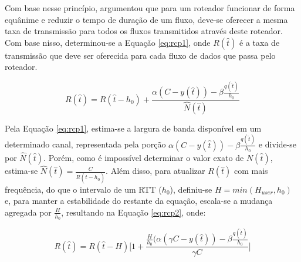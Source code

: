 Com base nesse princípio,  argumentou que para um roteador funcionar de forma equânime e reduzir o tempo de duração de um fluxo, deve-se oferecer a mesma taxa de transmissão para todos os fluxos transmitidos através deste roteador.
Com base nisso, determinou-se a Equação \ref{eq:rcp1}, onde $R(\hat{t})$ é a taxa de transmissão que deve ser oferecida para cada fluxo de dados que passa pelo roteador.

\begin{equation}
\label{eq:rcp1}
R(\hat{t}) = R(\hat{t}-h_0) + \frac{\alpha(C-y(\hat{t})) - \beta\frac{q(\hat{t})}{h_0}}{\hat{N}(\hat{t})}
\end{equation}

Pela Equação \ref{eq:rcp1}, estima-se a largura de banda disponível em um determinado canal, representada pela porção $\alpha(C-y(\hat{t})) - \beta\frac{q(\hat{t})}{h_0}$ e divide-se por $\hat{N}(\hat{t})$. Porém, como é impossível determinar o valor exato de $N(\hat{t})$, estima-se $\hat{N}(\hat{t}) = \frac{C}{R(\hat{t}-h_0)}$. Além disso, para atualizar $R(\hat{t})$ com mais frequência, do que o intervalo de um RTT ($h_0$), definiu-se $H=min(H_{user}, h_0)$ e, para manter a estabilidade do restante da equação, escala-se a mudança agregada por $\frac{H}{h_0}$, resultando na Equação \ref{eq:rcp2}, onde:

\begin{equation}
\label{eq:rcp2}
R(\hat{t}) = R(\hat{t}-H)
\Bigg[1+ \frac{\frac{H}{h_0} (\alpha(\gamma C-y(\hat{t})) - \beta\frac{q(\hat{t})}{h_0}}{\gamma C}\Bigg]
\end{equation}

